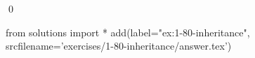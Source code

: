 
\begin{ex}
  \label{ex:1-80-inheritance}
  
  \qed
\end{ex}
\begin{python0}
from solutions import *
add(label="ex:1-80-inheritance",
    srcfilename='exercises/1-80-inheritance/answer.tex')
\end{python0}
